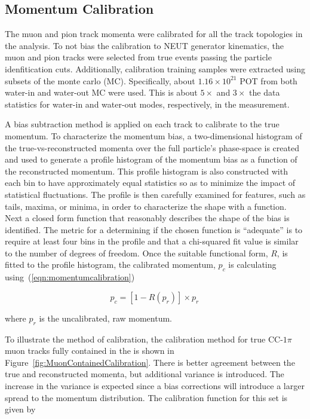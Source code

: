 \subsection{Momentum Calibration}\label{subsec:MomToolSubsamples}

The muon and pion track momenta were calibrated for all the track topologies in the analysis.
To not bias the calibration to NEUT generator kinematics,
the muon and pion tracks were selected from true events passing the particle idenfitication cuts.
Additionally, calibration training samples were extracted using subsets of the monte carlo (MC). Specifically,
about $1.16\times10^{21}$ POT from both water-in and water-out MC were used.
This is about $5\times$ and $3\times$ the data statistics for water-in and water-out modes, respectively, in the measurement.

A bias subtraction method is applied on each track to calibrate to the true
momentum. To characterize the momentum bias, a two-dimensional
histogram of the true-vs-reconstructed momenta over the full
particle's phase-space is created and used to generate a profile
histogram of the momentum bias as a function of the reconstructed
momentum. This profile histogram is also constructed with each bin to
have approximately equal statistics so as to minimize the impact of
statistical fluctuations. The profile is then carefully examined for
features, such as tails, maxima, or minima, in order to characterize
the shape with a function. Next a closed form function that reasonably describes
the shape of the bias is identified. The metric for a determining if
the chosen function is ``adequate'' is to require at least four bins in
the profile and that a chi-squared fit value is similar to the number of degrees of freedom.
Once the suitable functional form, $R$, is fitted to the profile
histogram, the calibrated momentum, $p_c$ is calculating using~(\ref{eqn:momentumcalibration})

\begin{equation}\label{eqn:momentumcalibration}
    p_c = [1 - R(p_r)] \times p_r\,
\end{equation}

\noindent{}where $p_r$ is the uncalibrated, raw momentum.

To illustrate the method of calibration, the calibration method for true CC-$1\pi$ muon tracks fully contained in the \podtext{}
is shown in Figure~\ref{fig:MuonContainedCalibration}.
There is better agreement between the true and reconstructed momenta, but additional variance is introduced.
The increase in the variance is expected since a bias corrections will introduce a larger spread to the momentum
distribution. The calibration function for this set is given by

